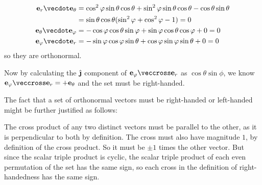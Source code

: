\documentclass[fleqn,a4paper,11pt]{article}
\begin{document}
\begin{enumerate}
    \begin{align*}
     \vec e_r \vecdot \vec e_\theta &=
      \cos^2 \phi \sin \theta \cos \theta
      + \sin^2 \phi \sin \theta \cos \theta - \cos \theta \sin \theta \\
      &= \sin \theta \cos \theta(\sin^2 \phi + \cos^2 \phi - 1) = 0 \\
     \vec e_\theta \vecdot \vec e_\phi &=
      -\cos \phi \cos \theta \sin \phi
      + \sin \phi \cos \theta \cos \phi + 0 = 0 \\
     \vec e_\phi \vecdot \vec e_r &=
      -\sin \phi \cos \phi \sin \theta
      + \cos \phi \sin \phi \sin \theta + 0 = 0
    \end{align*}
    so they are orthonormal.

    Now by calculating the \(\uvecj\) component of
    \(\vec e_\phi \veccross \vec e_r\) as
    \(\cos \theta \sin \phi\), we know
    \(\vec e_\phi \veccross \vec e_r = +\vec e_\theta\) and the set must be
    right-handed.

    The fact that a set of orthonormal vectors must be right-handed or
    left-handed might be further justified as follows:

    The cross product of any two distinct vectors must be parallel to the other,
    as it is perpendicular to both by definition. The cross must also have
    magnitude \(1\), by definition of the cross product. So it must be \(\pm 1\)
    times the other vector. But since the scalar triple product is cyclic, the
    scalar triple product of each even permutation of the set has the same sign,
    so each cross in the definition of right-handedness has the same sign.


\end{enumerate}
\end{document}

